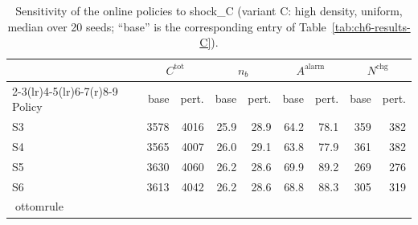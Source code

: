 \begin{table}[htbp]
\centering
\caption{Sensitivity of the online policies to shock_C (variant C: high density, uniform,
median over 20 seeds; ``base'' is the corresponding entry of
Table~\ref{tab:ch6-results-C}).}
\label{tab:ch6-sens-C-shock}
\footnotesize
\begin{tabular}{@{}l rr rr rr rr@{}}
\toprule
& \multicolumn{2}{c}{$C^{\mathrm{tot}}$} & \multicolumn{2}{c}{$n_b$}
  & \multicolumn{2}{c}{$A^{\mathrm{alarm}}$} & \multicolumn{2}{c}{$N^{\mathrm{chg}}$} \\
\cmidrule(r){2-3}\cmidrule(lr){4-5}\cmidrule(lr){6-7}\cmidrule(r){8-9}
Policy & base & pert. & base & pert. & base & pert. & base & pert. \\
\midrule

S3 & 3578 & 4016 & 25.9 & 28.9 & 64.2 & 78.1 & 359 & 382 \\
S4 & 3565 & 4007 & 26.0 & 29.1 & 63.8 & 77.9 & 361 & 382 \\
S5 & 3630 & 4060 & 26.2 & 28.6 & 69.9 & 89.2 & 269 & 276 \\
S6 & 3613 & 4042 & 26.2 & 28.6 & 68.8 & 88.3 & 305 & 319 \\
ottomrule
\end{tabular}
\end{table}
